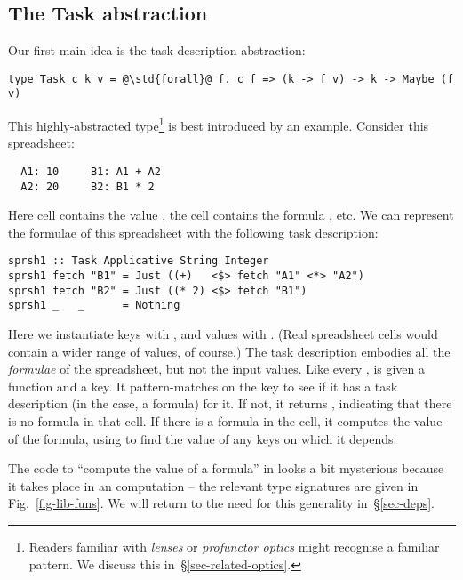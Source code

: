 \subsection{The Task abstraction}\label{sec-task}

Our first main idea is the task-description abstraction:
\begin{verbatim}
type Task c k v = @\std{forall}@ f. c f => (k -> f v) -> k -> Maybe (f v)
\end{verbatim}
This highly-abstracted type\footnote{Readers familiar with \emph{lenses} or
\emph{profunctor optics} might recognise a familiar pattern. We discuss this
in~\S\ref{sec-related-optics}.} is best introduced by an example.
Consider this \Excel spreadsheet:
\vspace{1mm}
\begin{verbatim}
  A1: 10     B1: A1 + A2
  A2: 20     B2: B1 * 2
\end{verbatim}
\vspace{1mm}
Here cell  contains the value , the cell  contains
the formula , etc. We can represent the formulae of this spreadsheet
with the following task description:
\vspace{1mm}
\begin{verbatim}
sprsh1 :: Task Applicative String Integer
sprsh1 fetch "B1" = Just ((+)   <$> fetch "A1" <*> "A2")
sprsh1 fetch "B2" = Just ((* 2) <$> fetch "B1")
sprsh1 _   _      = Nothing
\end{verbatim}
\vspace{1mm}
Here we instantiate keys  with , and values  with .
(Real spreadsheet cells would contain a wider range of values, of course.)
The task description  embodies all the \emph{formulae} of the spreadsheet,
but not the input values.  Like every ,  is given
a  function and a key. It pattern-matches on the key to see if it has
a task description (in the \Excel case, a formula)
for it.  If not, it returns , indicating that there is no formula in
that cell.  If there is a formula in the cell, it computes
the value of the formula, using  to find the value of any keys on
which it depends.

The code to ``compute the value of a formula'' in  looks a bit mysterious
because it takes place in an  computation \cite{mcbride2008applicative}
-- the relevant type signatures
are given in Fig.~\ref{fig-lib-funs}. We will return to the need for this
generality in~\S\ref{sec-deps}.

